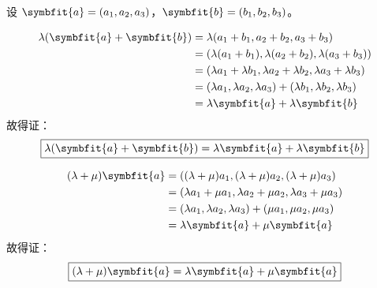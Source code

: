 \begin{myproof}
    设 $\symbfit{a} = (a_1, a_2, a_3)$，$\symbfit{b} = (b_1, b_2, b_3)$。


    \begin{equation}
        \begin{aligned}
            \lambda(\symbfit{a} + \symbfit{b}) & = \lambda(a_1 + b_1, a_2 + b_2, a_3 + b_3)                                          \\
                                               & = (\lambda(a_1 + b_1), \lambda(a_2 + b_2), \lambda(a_3 + b_3))                      \\
                                               & = (\lambda a_1 + \lambda b_1, \lambda a_2 + \lambda b_2, \lambda a_3 + \lambda b_3) \\
                                               & = (\lambda a_1, \lambda a_2, \lambda a_3) + (\lambda b_1, \lambda b_2, \lambda b_3) \\
                                               & = \lambda\symbfit{a} + \lambda\symbfit{b}
        \end{aligned}
    \end{equation}
    故得证：
    \begin{equation}
        \boxed{\lambda(\symbfit{a} + \symbfit{b}) = \lambda\symbfit{a} + \lambda\symbfit{b}}
    \end{equation}


    \begin{equation}
        \begin{aligned}
            (\lambda + \mu)\symbfit{a} & = ((\lambda + \mu)a_1, (\lambda + \mu)a_2, (\lambda + \mu)a_3)          \\
                                       & = (\lambda a_1 + \mu a_1, \lambda a_2 + \mu a_2, \lambda a_3 + \mu a_3) \\
                                       & = (\lambda a_1, \lambda a_2, \lambda a_3) + (\mu a_1, \mu a_2, \mu a_3) \\
                                       & = \lambda\symbfit{a} + \mu\symbfit{a}
        \end{aligned}
    \end{equation}
    故得证：
    \begin{equation}
        \boxed{(\lambda + \mu)\symbfit{a} = \lambda\symbfit{a} + \mu\symbfit{a}}
    \end{equation}


\end{myproof}
